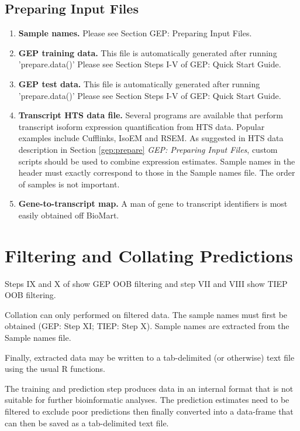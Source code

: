 \documentclass[a4paper,12pt]{article}
\begin{document}
\subsection{Preparing Input Files}
\label{tiep:prepare}
\begin{enumerate}
\item \textbf{Sample names.} Please see Section GEP: Preparing Input Files.

\item \textbf{GEP training data.} This file is automatically generated after running 'prepare.data()' Please see Section Steps I-V of GEP: Quick Start Guide.

\item \textbf{GEP test data.} This file is automatically generated after running 'prepare.data()' Please see Section Steps I-V of GEP: Quick Start Guide.

\item \textbf{Transcript HTS data file.} Several programs are available that perform transcript isoform expression quantification from HTS data. Popular examples include \textsf{Cufflinks}, \textsf{IsoEM} and \textsf{RSEM}. As suggested in HTS data description in Section \ref{gep:prepare} \textit{GEP: Preparing Input Files}, custom scripts should be used to combine expression estimates. Sample names in the header must exactly correspond to those in the Sample names file. The order of samples is not important.

\item \textbf{Gene-to-transcript map.} A man of gene to transcript identifiers is most easily obtained off \textsf{BioMart}.
\end{enumerate}

\section{Filtering and Collating Predictions}
\label{filtering}
Steps IX and X of show GEP OOB filtering and step VII and VIII show TIEP OOB filtering.

Collation can only performed on filtered data. The sample names must first be obtained (GEP: Step XI; TIEP: Step X). Sample names are extracted from the Sample names file.

Finally, extracted data may be written to a tab-delimited (or otherwise) text file using the usual \textsf{R} functions.

The training and prediction step produces data in an internal format that is not suitable for further bioinformatic analyses. The prediction estimates need to be filtered to exclude poor predictions then finally converted into a data-frame that can then be saved as a tab-delimited text file.
\end{document}
